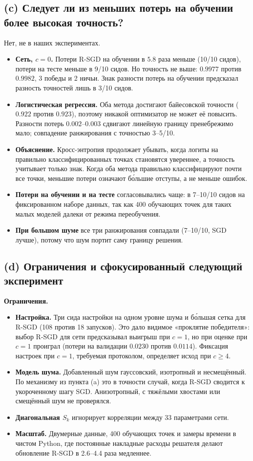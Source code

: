 \documentclass[11pt,a4paper]{article}
\begin{document}
\subsection{(c) Следует ли из меньших потерь на обучении более высокая точность?}

Нет, не в наших экспериментах.
\begin{itemize}
\item \textbf{Сеть, $c=0$.} Потери R-SGD на обучении в $5.8$ раза меньше (10/10 сидов), потери на
тесте меньше в 9/10 сидов. Но точность не выше: $0.9977$ против $0.9982$, 3 победы и 2 ничьи. Знак
разности потерь на обучении предсказал разность точностей лишь в 3/10 сидов.
\item \textbf{Логистическая регрессия.} Оба метода достигают байесовской точности ($0.922$ против
$0.923$), поэтому никакой оптимизатор не может её повысить. Разности потерь $0.002$--$0.003$
сдвигают линейную границу пренебрежимо мало; совпадение ранжирования с точностью 3--5/10.
\item \textbf{Объяснение.} Кросс-энтропия продолжает убывать, когда логиты на правильно
классифицированных точках становятся увереннее, а точность учитывает только знак. Когда оба метода
правильно классифицируют почти все точки, меньшие потери означают бо́льшие отступы, а не меньше ошибок.
\item \textbf{Потери на обучении и на тесте} согласовывались чаще: в 7--10/10 сидов на фиксированном
наборе данных, так как 400 обучающих точек для таких малых моделей далеки от режима переобучения.
\item \textbf{При большом шуме} все три ранжирования совпадали (7--10/10, SGD лучше), потому что шум
портит саму границу решения.
\end{itemize}

\subsection{(d) Ограничения и сфокусированный следующий эксперимент}

\textbf{Ограничения.}
\begin{itemize}
\item \textbf{Настройка.} Три сида настройки на одном уровне шума и бо́льшая сетка для R-SGD (108
против 18 запусков). Это дало видимое «проклятие победителя»: выбор R-SGD для сети предсказывал
выигрыш при $c=1$, но при оценке при $c=1$ проиграл (потери на валидации $0.0230$ против $0.0114$).
Фиксация настроек при $c=1$, требуемая протоколом, определяет исход при $c\ge4$.
\item \textbf{Модель шума.} Добавленный шум гауссовский, изотропный и несмещённый. По механизму из
пункта (a) это в точности случай, когда R-SGD сводится к укороченному шагу SGD. Анизотропный, с
тяжёлыми хвостами или смещённый шум не проверялся.
\item \textbf{Диагональная $S_k$} игнорирует корреляции между 33 параметрами сети.
\item \textbf{Масштаб.} Двумерные данные, 400 обучающих точек и замеры времени в чистом Python, где
постоянные накладные расходы решателя делают обновление R-SGD в 2.6--4.4 раза медленнее.
\end{itemize}
\end{document}
